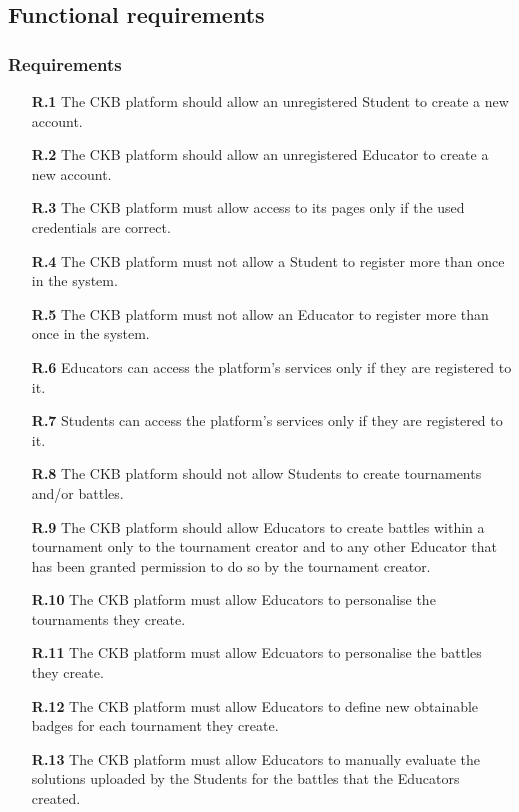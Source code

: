\documentclass{article}
\begin{document}
{\newpage
\subsection{Functional requirements}
\subsubsection{Requirements}
\begin{itemize}

    \item[\textbf{R.1}] The CKB platform should allow an unregistered Student to create a new account.
    \item[\textbf{R.2}] The CKB platform should allow an unregistered Educator to create a new account.
    \item[\textbf{R.3}] The CKB platform must allow access to its pages only if the used credentials are correct.
    \item[\textbf{R.4}] The CKB platform must not allow a Student to register more than once in the system.
    \item[\textbf{R.5}] The CKB platform must not allow an Educator to register more than once in the system.
    \item[\textbf{R.6}] Educators can access the platform's services only if they are registered to it.
    \item[\textbf{R.7}] Students can access the platform's services only if they are registered to it.
    \item[\textbf{R.8}] The CKB platform should not allow Students to create tournaments and/or battles.
    \item[\textbf{R.9}] The CKB platform should allow Educators to create battles within a tournament only to the tournament
          creator and to any other Educator that has been granted permission to do so by the tournament creator.
    \item[\textbf{R.10}] The CKB platform must allow Educators to personalise the tournaments they create.
    \item[\textbf{R.11}] The CKB platform must allow Edcuators to personalise the battles they create.
    \item[\textbf{R.12}] The CKB platform must allow Educators to define new obtainable badges for each tournament they
          create.
    \item[\textbf{R.13}] The CKB platform must allow Educators to manually evaluate the solutions uploaded by the Students for the battles that
          the Educators created.

\end{itemize}}
\end{document}
